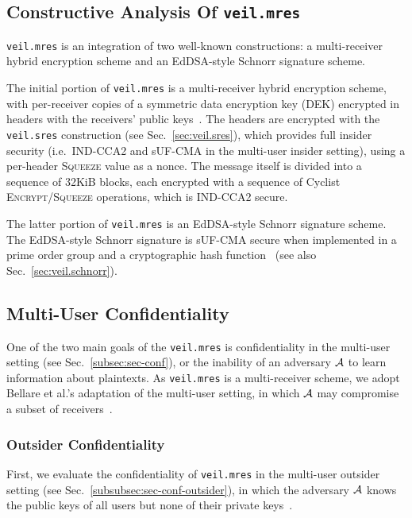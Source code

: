 \subsection{Constructive Analysis Of \texttt{veil.mres}}\label{subsec:veil.mres-analysis}

\texttt{veil.mres} is an integration of two well-known constructions: a multi-receiver hybrid encryption scheme and an
EdDSA-style Schnorr signature scheme.

The initial portion of \texttt{veil.mres} is a multi-receiver hybrid encryption scheme, with per-receiver copies of a
symmetric data encryption key (DEK) encrypted in headers with the receivers' public
keys~\cite{kurosawa2002, bellare2003, bellare2007, rfc4880}.
The headers are encrypted with the \texttt{veil.sres} construction (see Sec.~\ref{sec:veil.sres}), which provides full
insider security (i.e.\ IND-CCA2 and sUF-CMA in the multi-user insider setting), using a per-header \textsc{Squeeze}
value as a nonce.
The message itself is divided into a sequence of 32KiB blocks, each encrypted with a sequence of Cyclist
\textsc{Encrypt}/\textsc{Squeeze} operations, which is IND-CCA2 secure.

The latter portion of \texttt{veil.mres} is an EdDSA-style Schnorr signature scheme.
The EdDSA-style Schnorr signature is sUF-CMA secure when implemented in a prime order group and a cryptographic hash
function~\cite{brendel2021, chalkias2020, pointcheval2000, neven2009} (see also Sec.~\ref{sec:veil.schnorr}).

\subsection{Multi-User Confidentiality}\label{subsec:veil.mres-conf}

One of the two main goals of the \texttt{veil.mres} is confidentiality in the multi-user setting
(see Sec.~\ref{subsec:sec-conf}), or the inability of an adversary $\mathcal{A}$ to learn information about plaintexts.
As \texttt{veil.mres} is a multi-receiver scheme, we adopt Bellare et al.'s adaptation of the multi-user
setting, in which $\mathcal{A}$ may compromise a subset of receivers~\cite{bellare2007}.

\subsubsection{Outsider Confidentiality}

First, we evaluate the confidentiality of \texttt{veil.mres} in the multi-user outsider setting
(see Sec.~\ref{subsubsec:sec-conf-outsider}), in which the adversary $\mathcal{A}$ knows the public keys of all users but
none of their private keys~\cite[p. 44]{baek2010}.

